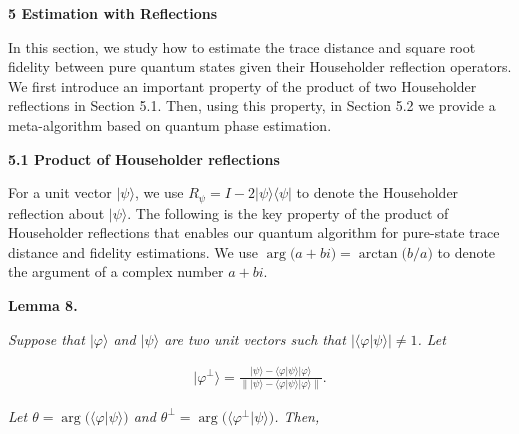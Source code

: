 \documentclass[10pt,a4paper]{article}
\begin{document}





\par\medskip\noindent\textbf{
5 Estimation with Reflections}\par




In this section, we study how to estimate the trace distance and square root fidelity between pure quantum states given their Householder reflection operators.
We first introduce an important property of the product of two Householder reflections in Section 5.1.
Then, using this property, in Section 5.2 we provide a meta-algorithm based on quantum phase estimation.\par




\par\medskip\noindent\textbf{
5.1 Product of Householder reflections}\par




For a unit vector $\lvert\psi\rangle$, we use $R_{\psi}=I-2\lvert\psi\rangle\!\langle\psi\rvert$ to denote the Householder reflection about $\lvert\psi\rangle$.
The following is the key property of the product of Householder reflections that enables our quantum algorithm for pure-state trace distance and fidelity estimations.
We use $\arg\lparen a+bi\rparen=\arctan\lparen b/a\rparen$ to denote the argument of a complex number $a+bi$.\par





\par\medskip\noindent\textbf{
\textbf{Lemma 8}\textbf{.}
}\par



\emph{Suppose that $\lvert\varphi\rangle$ and $\lvert\psi\rangle$ are two unit vectors such that $\big\lvert\langle\varphi|\psi\rangle\big\rvert\neq 1$.
Let}\par


\[\begin{gathered}
\lvert\varphi^{\perp}\rangle=\frac{\lvert\psi\rangle-\langle\varphi|\psi\rangle\lvert\varphi\rangle}{\left\lVert\lvert\psi\rangle-\langle\varphi|\psi\rangle\lvert\varphi\rangle\right\rVert}.
\end{gathered}\]


\emph{Let $\theta=\arg\lparen\langle\varphi|\psi\rangle\rparen$ and $\theta^{\perp}=\arg\lparen\langle\varphi^{\perp}|\psi\rangle\rparen$.
Then,}\par
\end{document}
